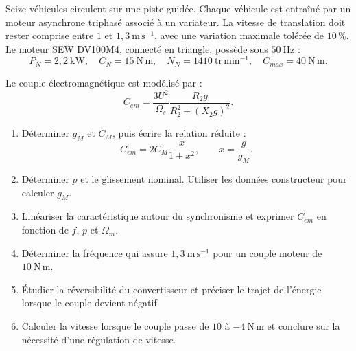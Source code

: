 \begin{center}
\hfill
{}
\end{center}

Seize véhicules circulent sur une piste guidée. Chaque véhicule est entraîné par un moteur asynchrone triphasé associé à un variateur. La vitesse de translation doit rester comprise entre $1$ et $1{,}3\ \mathrm{m\,s^{-1}}$, avec une variation maximale tolérée de $10\,\%$. Le moteur SEW DV100M4, connecté en triangle, possède sous $50\ \mathrm{Hz}$ :
\[
P_N=2{,}2\ \mathrm{kW},\quad C_N=15\ \mathrm{N\,m},\quad
N_N=1410\ \mathrm{tr\,min^{-1}},\quad C_{max}=40\ \mathrm{N\,m}.
\]

Le couple électromagnétique est modélisé par :
\[
C_{em}=\frac{3U^2}{\Omega_s}\frac{R_2g}{R_2^2+(X_2g)^2}.
\]

\begin{enumerate}
  \item Déterminer $g_M$ et $C_M$, puis écrire la relation réduite :
  \[
  C_{em}=2C_M\frac{x}{1+x^2},\qquad x=\frac{g}{g_M}.
  \]
  \item Déterminer $p$ et le glissement nominal. Utiliser les données constructeur pour calculer $g_M$.
  \item Linéariser la caractéristique autour du synchronisme et exprimer $C_{em}$ en fonction de $f$, $p$ et $\Omega_m$.
  \item Déterminer la fréquence qui assure $1{,}3\ \mathrm{m\,s^{-1}}$ pour un couple moteur de $10\ \mathrm{N\,m}$.
  \item Étudier la réversibilité du convertisseur et préciser le trajet de l'énergie lorsque le couple devient négatif.
  \item Calculer la vitesse lorsque le couple passe de $10$ à $-4\ \mathrm{N\,m}$ et conclure sur la nécessité d'une régulation de vitesse.
\end{enumerate}
